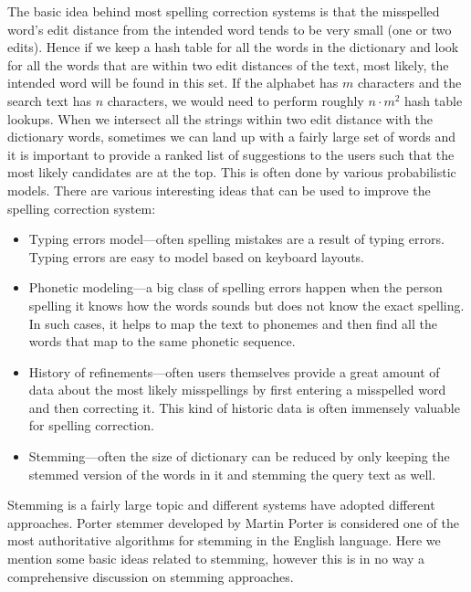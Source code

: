 The basic idea behind most spelling correction systems is that the misspelled word's edit distance from the intended word tends to be very small 
(one or two edits). Hence if we keep a hash table for all the words in the dictionary and
look for all the words that are within two edit distances of the text, most
likely, the intended word will be found in this set.  If the alphabet
has $m$ characters and the search text
has $n$ characters, we would need to perform roughly $n\cdot m^2$ hash table lookups. When we intersect all the strings within two edit
distance with the dictionary words, sometimes we can land up with a
fairly large set of words and it is important to provide a ranked list
of suggestions to the users such that the most likely candidates are at
the top. This is often done by various probabilistic
models. There are various interesting ideas that can be used to
improve the spelling correction system:
\begin{itemize}
\itemsep 1pt
\item \textrm{Typing errors model}---often spelling mistakes are a result
  of typing errors. Typing errors are easy to model based on keyboard
  layouts.
\item\textrm{Phonetic modeling}---a big class of spelling errors happen
  when the person spelling it knows how the words sounds but does not
  know the exact spelling. In such cases, it helps to map the text to
   phonemes and then find all the words that map to the same phonetic
  sequence.
\item\textrm{History of refinements}---often users themselves provide a
  great amount of data about the most likely misspellings by first
  entering a misspelled word and then correcting it. 
  This kind of historic data is often immensely valuable for spelling
  correction.
\item\textrm{Stemming}---often the size of dictionary can be reduced by only
keeping the stemmed version of the words in it and stemming the query
text as well.
\end{itemize}

Stemming is a fairly large topic and different systems have adopted
different approaches. Porter stemmer developed by Martin Porter is
considered one of the most authoritative algorithms for stemming in
the English language. Here we mention some basic ideas related to
stemming, however this is in no way a comprehensive discussion on
stemming approaches.
 

